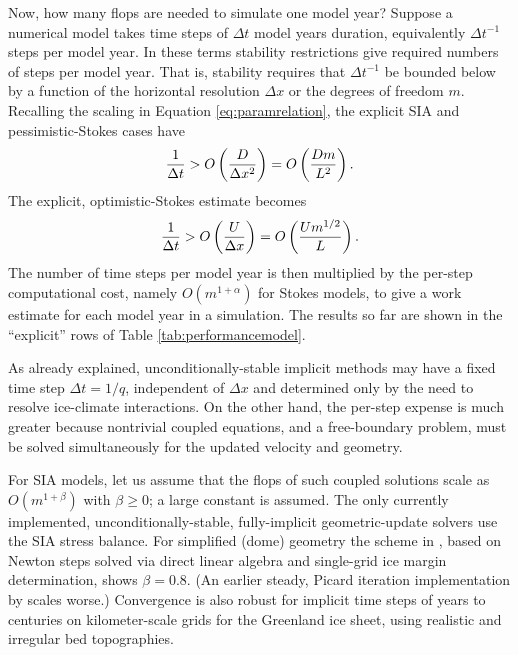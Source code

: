 \documentclass[review,letterpaper]{igs}
\begin{document}
Now, how many flops are needed to simulate one model year?  Suppose a numerical model takes time steps of $\Delta t$ model years duration, equivalently $\Delta t^{-1}$ steps per model year.  In these terms stability restrictions give required numbers of steps per model year.  That is, stability requires that $\Delta t^{-1}$ be bounded below by a function of the horizontal resolution $\Delta x$ or the degrees of freedom $m$.  Recalling the scaling in Equation \eqref{eq:paramrelation}, the explicit SIA and pessimistic-Stokes cases have
\begin{equation}
\frac{1}{\Delta t} > \displaystyle O\left(\frac{D}{\Delta x^2}\right) = \displaystyle O\left(\frac{D m}{L^2}\right). \label{eq:explicitsiarequired}
\end{equation}
The explicit, optimistic-Stokes estimate becomes
\begin{equation}
\frac{1}{\Delta t} > \displaystyle O\left(\frac{U}{\Delta x}\right) = \displaystyle O\left(\frac{U m^{1/2}}{L}\right). \label{eq:explicitoptstokesrequired}
\end{equation}
The number of time steps per model year is then multiplied by the per-step computational cost, namely $O(m^{1+\alpha})$ for Stokes models, to give a work estimate for each model year in a simulation.  The results so far are shown in the ``explicit'' rows of Table \ref{tab:performancemodel}.

As already explained, unconditionally-stable implicit methods may have a fixed time step $\Delta t = 1/q$, independent of $\Delta x$ and determined only by the need to resolve ice-climate interactions.  On the other hand, the per-step expense is much greater because nontrivial coupled equations, and a free-boundary problem, must be solved simultaneously for the updated velocity and geometry.

For SIA models, let us assume that the flops of such coupled solutions scale as $O(m^{1+\beta})$ with $\beta \ge 0$; a large constant is assumed.  The only currently implemented, unconditionally-stable, fully-implicit geometric-update solvers use the SIA stress balance.  For simplified (dome) geometry the scheme in \cite{Bueler2016}, based on Newton steps solved via direct linear algebra and single-grid ice margin determination, shows $\beta=0.8$.  (An earlier steady, Picard iteration implementation by \cite{JouvetBueler2012} scales worse.)  Convergence is also robust for implicit time steps of years to centuries on kilometer-scale grids for the Greenland ice sheet, using realistic and irregular bed topographies.
\end{document}
